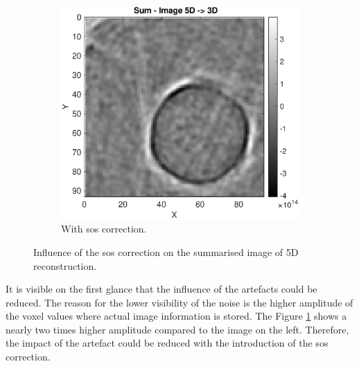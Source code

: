 \begin{figure}[H]
\begin{subfigure}[b]{0.47\textwidth}
         \includegraphics[width=1.09\linewidth]{Graphics/Results/14_vecs_sos_vs_noSos/sum_14vecs_with_sos_z_direction.eps}
         \caption{With \ac{sos} correction. }
         \label{sos:influence_sum_images_with}
     \end{subfigure}
        \caption{Influence of the \ac{sos} correction on the summarised image of 5D reconstruction.}
        \label{sos:influence_sum_images}
\end{figure}

It is visible on the first glance that the influence of the artefacts could be reduced. The reason for the lower visibility of the noise is the higher amplitude of the voxel values where actual image information is stored. The Figure \ref{sos:influence_sum_images_with} shows a nearly two times higher amplitude compared to the image on the left. Therefore, the impact of the artefact could be reduced with the introduction of the \ac{sos} correction.

\bigskip

